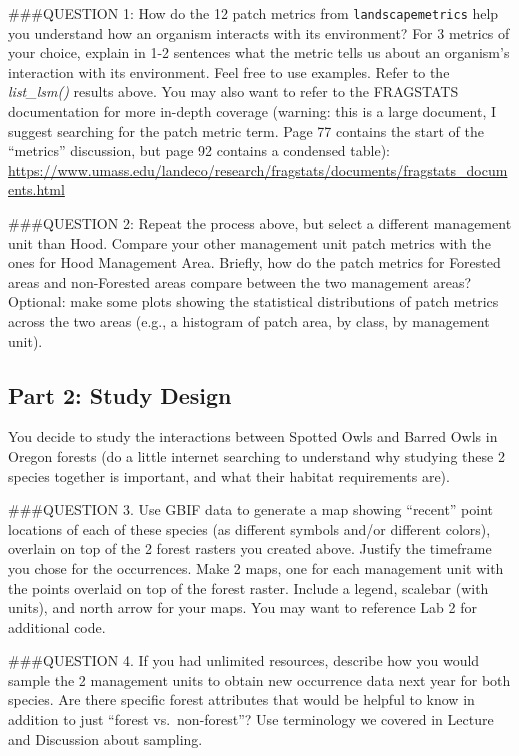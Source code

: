 \documentclass[
]{article}
\begin{document}
\#\#\#QUESTION 1: How do the 12 patch metrics from
\texttt{landscapemetrics} help you understand how an organism interacts
with its environment? For 3 metrics of your choice, explain in 1-2
sentences what the metric tells us about an organism's interaction with
its environment. Feel free to use examples. Refer to the
\emph{list\_lsm()} results above. You may also want to refer to the
FRAGSTATS documentation for more in-depth coverage (warning: this is a
large document, I suggest searching for the patch metric term. Page 77
contains the start of the ``metrics'' discussion, but page 92 contains a
condensed table):
\url{https://www.umass.edu/landeco/research/fragstats/documents/fragstats_documents.html}

\#\#\#QUESTION 2: Repeat the process above, but select a different
management unit than Hood. Compare your other management unit patch
metrics with the ones for Hood Management Area. Briefly, how do the
patch metrics for Forested areas and non-Forested areas compare between
the two management areas? Optional: make some plots showing the
statistical distributions of patch metrics across the two areas (e.g., a
histogram of patch area, by class, by management unit).

\hypertarget{part-2-study-design}{%
\subsection{Part 2: Study Design}\label{part-2-study-design}}

You decide to study the interactions between Spotted Owls and Barred
Owls in Oregon forests (do a little internet searching to understand why
studying these 2 species together is important, and what their habitat
requirements are).

\#\#\#QUESTION 3. Use GBIF data to generate a map showing ``recent''
point locations of each of these species (as different symbols and/or
different colors), overlain on top of the 2 forest rasters you created
above. Justify the timeframe you chose for the occurrences. Make 2 maps,
one for each management unit with the points overlaid on top of the
forest raster. Include a legend, scalebar (with units), and north arrow
for your maps. You may want to reference Lab 2 for additional code.

\#\#\#QUESTION 4. If you had unlimited resources, describe how you would
sample the 2 management units to obtain new occurrence data next year
for both species. Are there specific forest attributes that would be
helpful to know in addition to just ``forest vs.~non-forest''? Use
terminology we covered in Lecture and Discussion about sampling.
\end{document}
